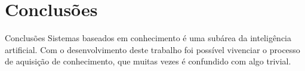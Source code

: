 \renewcommand{\titulo}{Conclusões}
\section{\titulo}
\begin{frame}{\titulo}
Sistemas baseados em conhecimento é uma subárea da inteligência artificial. Com o desenvolvimento deste trabalho foi possível vivenciar o processo de aquisição de conhecimento, que muitas vezes é confundido com algo trivial.
\end{frame}

